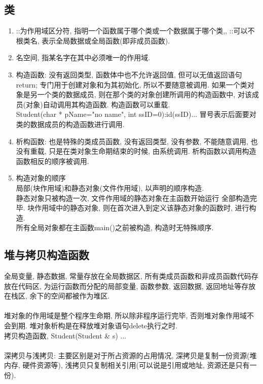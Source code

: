 \documentclass[a4paper,10pt,english]{article}
\begin{document}
\subsection{类}
\begin{enumerate}
\item {::}为作用域区分符, 指明一个函数属于哪个类或一个数据属于哪个类,, ::可以不根类名, 表示全局数据或全局函数(即非成员函数).
\item {名空间}, 指某名字在其中必须唯一的作用域. 
\item {构造函数}: 没有返回类型, 函数体中也不允许返回值, 但可以无值返回语句return; 专门用于创建对象和为其初始化, 所以不要随意被调用. 如果一个类对象是另一个类的数据成员, 则在那个类的对象创建所调用的构造函数中, 对该成员(对象)自动调用其构造函数. 构造函数可以重载. \\
Student(char * pName="no name", int ssID=0):id(ssID){...} 冒号表示后面要对类的数据成员的构造函数进行调用. 
\item {析构函数}: 也是特殊的类成员函数, 没有返回类型, 没有参数, 不能随意调用, 也没有重载, 只是在类对象生命期结束的时候, 由系统调用. 析构函数以调用构造函数相反的顺序被调用.
\item {构造对象的顺序} \\
局部(块作用域)和静态对象(文件作用域), 以声明的顺序构造. \\
静态对象只被构造一次, 文件作用域的静态对象在主函数开始运行 全部构造完毕. 块作用域中的静态对象, 则在首次进入到定义该静态对象的函数时, 进行构造. \\
所有全局对象都在主函数main()之前被构造, 构造时无特殊顺序. 
\end{enumerate}

\subsection{堆与拷贝构造函数}
全局变量, 静态数据, 常量存放在全局数据区, 所有类成员函数和非成员函数代码存放在代码区, 为运行函数而分配的局部变量, 函数参数, 返回数据, 返回地址等存放在栈区, 余下的空间都被作为堆区.\\\\
堆对象的作用域是整个程序生命期, 所以除非程序运行完毕, 否则堆对象作用域不会到期. 堆对象析构是在释放堆对象语句delete执行之时. \\
拷贝构造函数, Student(Student \& s) {...} \\\\
深拷贝与浅拷贝: 主要区别是对于所占资源的占用情况, 深拷贝是复制一份资源(堆内存, 硬件资源等), 浅拷贝只复制相关引用(可以说是引用或地址, 资源还是只有一份). 
\end{document}
